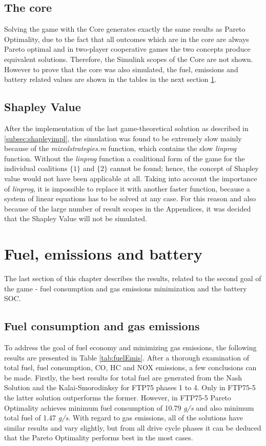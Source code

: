 \subsection{The core}
Solving the game with the Core generates exactly the same results as Pareto Optimality, due to the fact that all outcomes which are in the core are always Pareto optimal and in two-player cooperative games the two concepts produce equivalent solutions. Therefore, the Simulink scopes of the Core are not shown. However to prove that the core was also simulated, the fuel, emissions and battery related values are shown in the tables in the next section \ref{sec:goalresults}.

\subsection{Shapley Value}
After the implementation of the last game-theoretical solution as described in \ref{subsec:shapleyimpl}, the simulation was found to be extremely slow mainly because of the \textit{mixedstrategies.m} function, which contains the slow \textit{linprog} function. Without the \textit{linprog} function a coalitional form of the game for the individual coalitions $\{1\}$ and $\{2\}$ cannot be found; hence, the concept of Shapley value would not have been applicable at all. Taking into account the importance of \textit{linprog}, it is impossible to replace it with another faster function, because a system of linear equations has to be solved at any case. For this reason and also because of the large number of result scopes in the Appendices, it was decided that the Shapley Value will not be simulated.

\section{Fuel, emissions and battery}
\label{sec:goalresults}
The last section of this chapter describes the results, related to the second goal of the game - fuel consumption and gas emissions minimization and the battery SOC.

\subsection{Fuel consumption and gas emissions}
To address the goal of fuel economy and minimizing gas emissions, the following results are presented in Table \ref{tab:fuelEmis}. After a thorough examination of total fuel, fuel consumption, CO, HC and NOX emissions, a few conclusions can be made. Firstly, the best results for total fuel are generated from the Nash Solution and the Kalai-Smorodinksy for FTP75 phases 1 to 4. Only in FTP75-5 the latter solution outperforms the former. However, in FTP75-5 Pareto Optimality achieves minimum fuel consumption of 10.79 \textit{g/s} and also minimum total fuel of 1.47 \textit{g/s}. With regard to gas emissions, all of the solutions have similar results and vary slightly, but from all drive cycle phases it can be deduced that the Pareto Optimality performs best in the most cases.


